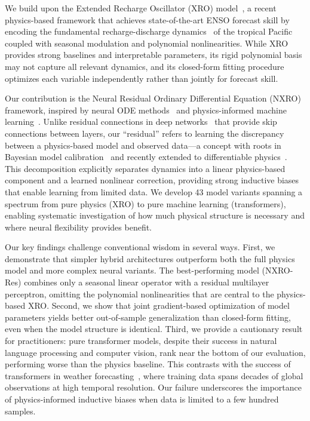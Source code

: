 We build upon the Extended Recharge Oscillator (XRO) model~\cite{zhao2024xro}, a recent physics-based framework that achieves state-of-the-art ENSO forecast skill by encoding the fundamental recharge-discharge dynamics~\cite{jin1997equatorial} of the tropical Pacific coupled with seasonal modulation and polynomial nonlinearities. While XRO provides strong baselines and interpretable parameters, its rigid polynomial basis may not capture all relevant dynamics, and its closed-form fitting procedure optimizes each variable independently rather than jointly for forecast skill.

Our contribution is the Neural Residual Ordinary Differential Equation (NXRO) framework, inspired by neural ODE methods~\cite{chen2018neuralode,rubanova2019latent} and physics-informed machine learning~\cite{karniadakis2021physics}. Unlike residual connections in deep networks~\cite{he2016deep} that provide skip connections between layers, our ``residual'' refers to learning the discrepancy between a physics-based model and observed data---a concept with roots in Bayesian model calibration~\cite{kennedy2001bayesian} and recently extended to differentiable physics~\cite{um2020solver,list2022learned}. This decomposition explicitly separates dynamics into a linear physics-based component and a learned nonlinear correction, providing strong inductive biases~\cite{bronstein2021geometric} that enable learning from limited data. We develop 43 model variants spanning a spectrum from pure physics (XRO) to pure machine learning (transformers), enabling systematic investigation of how much physical structure is necessary and where neural flexibility provides benefit.

Our key findings challenge conventional wisdom in several ways. First, we demonstrate that simpler hybrid architectures outperform both the full physics model and more complex neural variants. The best-performing model (NXRO-Res) combines only a seasonal linear operator with a residual multilayer perceptron, omitting the polynomial nonlinearities that are central to the physics-based XRO. Second, we show that joint gradient-based optimization of model parameters yields better out-of-sample generalization than closed-form fitting, even when the model structure is identical. Third, we provide a cautionary result for practitioners: pure transformer models, despite their success in natural language processing and computer vision, rank near the bottom of our evaluation, performing worse than the physics baseline. This contrasts with the success of transformers in weather forecasting~\cite{bi2023accurate,lam2023learning,pathak2022fourcastnet}, where training data spans decades of global observations at high temporal resolution. Our failure underscores the importance of physics-informed inductive biases when data is limited to a few hundred samples.

